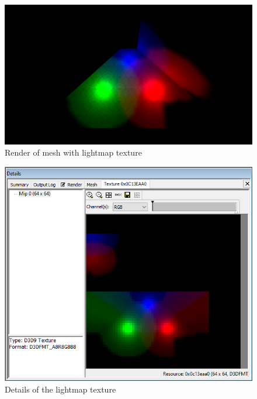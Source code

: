 \begin{appendix}
 
\begin{figure}[htbp]
	\centering
		\includegraphics[width=1.00\textwidth]{img/PIX/PIX_lightbaking_render.png}
	\caption[Render of mesh with lightmap texture]{Render of mesh with lightmap texture}
	\label{fig:PIXLightmapRender}
\end{figure}

\begin{figure}[htbp]
	\centering
		\includegraphics[width=1.00\textwidth]{img/PIX/PIX_lightmap_details.png}
	\caption[Details of the lightmap texture]{Details of the lightmap texture}
	\label{fig:PIXLightmapDetails}
\end{figure}


\end{appendix}
